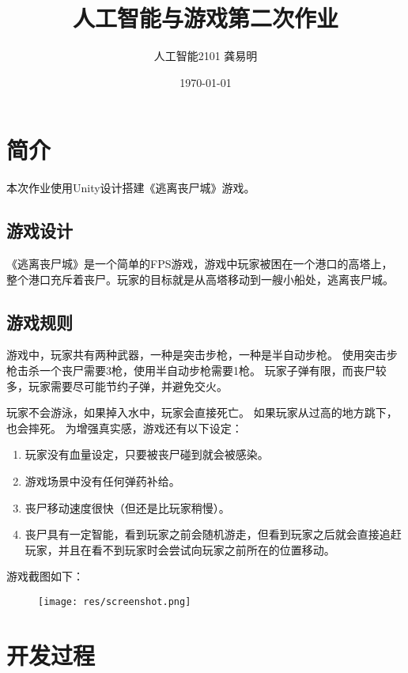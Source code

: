 \documentclass{article}
\title{人工智能与游戏第二次作业}
\author{人工智能2101 龚易明}
\date{\today}
\begin{document}
\maketitle

\section{简介}

本次作业使用Unity设计搭建《逃离丧尸城》游戏。

\subsection{游戏设计}

《逃离丧尸城》是一个简单的FPS游戏，游戏中玩家被困在一个港口的高塔上，
整个港口充斥着丧尸。玩家的目标就是从高塔移动到一艘小船处，逃离丧尸城。

\subsection{游戏规则}

游戏中，玩家共有两种武器，一种是突击步枪，一种是半自动步枪。
使用突击步枪击杀一个丧尸需要3枪，使用半自动步枪需要1枪。
玩家子弹有限，而丧尸较多，玩家需要尽可能节约子弹，并避免交火。

玩家不会游泳，如果掉入水中，玩家会直接死亡。
如果玩家从过高的地方跳下，也会摔死。
为增强真实感，游戏还有以下设定：

\begin{enumerate}
    \item 玩家没有血量设定，只要被丧尸碰到就会被感染。
    \item 游戏场景中没有任何弹药补给。
    \item 丧尸移动速度很快（但还是比玩家稍慢）。
    \item 丧尸具有一定智能，看到玩家之前会随机游走，但看到玩家之后就会直接追赶玩家，并且在看不到玩家时会尝试向玩家之前所在的位置移动。
\end{enumerate}

游戏截图如下：

\begin{figure}[H]
    \begin{center}
        \texttt{[image: res/screenshot.png]}
    \end{center}
\end{figure}

\section{开发过程}
\end{document}
